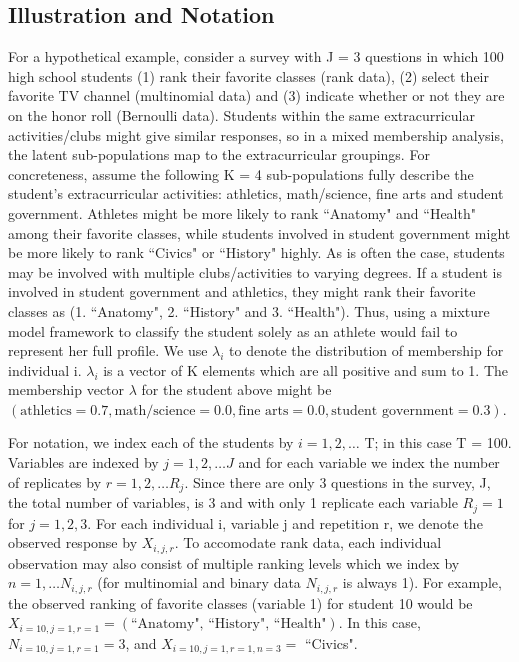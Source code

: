 \documentclass{article}\usepackage[]{graphicx}\usepackage[]{color}
\begin{document}
\subsection{Illustration and Notation}
For a hypothetical example, consider a survey with J = 3 questions in which 100 high school students (1) rank their favorite classes (rank data), (2) select their favorite TV channel (multinomial data) and (3) indicate whether or not they are on the honor roll (Bernoulli data). Students within the same extracurricular activities/clubs might give similar responses, so in a mixed membership analysis, the latent sub-populations map to the extracurricular groupings. For concreteness, assume the following K = 4 sub-populations fully describe the student's extracurricular activities: athletics, math/science, fine arts and student government. Athletes might be more likely to rank ``Anatomy" and ``Health" among their favorite classes, while students involved in student government might be more likely to rank ``Civics" or ``History" highly.  As is often the case, students may be involved with multiple clubs/activities to varying degrees. If a student is involved in student government and athletics, they might rank their favorite classes as (1. ``Anatomy", 2. ``History" and 3. ``Health"). Thus, using a mixture model framework to classify the student solely as an athlete would fail to represent her full profile. We use $\lambda_i$ to denote the distribution of membership for individual i. $\lambda_i$ is a vector of K elements which are all positive and sum to 1. The membership vector $\lambda$ for the student above might be $\left(\text{athletics} = 0.7, \text{math/science} = 0.0, \text{fine arts} = 0.0, \text{student government} = 0.3\right)$.

For notation, we index each of the students by $i = 1,2, \ldots$ T; in this case T = 100. Variables are indexed by $j = 1,2,\ldots J$ and for each variable we index the number of replicates by $r = 1,2,\ldots R_j$. Since there are only 3 questions in the survey, J, the total number of variables, is 3 and with only 1 replicate each variable $R_j = 1$ for $j = 1,2,3$. For each individual i, variable j and repetition r, we denote the observed response by $X_{i,j,r}$. To accomodate rank data, each individual observation may also consist of multiple ranking levels which we index by $n = 1, \ldots N_{i,j,r}$ (for multinomial and binary data $N_{i,j,r}$ is always 1). For example, the observed ranking of favorite classes (variable 1) for student 10 would be $X_{i = 10, j = 1, r = 1} = \left(\text{``Anatomy", ``History", ``Health"}\right)$. In this case, $N_{i = 10, j = 1, r = 1} = 3$, and $X_{i = 10,j = 1,r = 1,n = 3} =$ ``Civics".    
\end{document}
